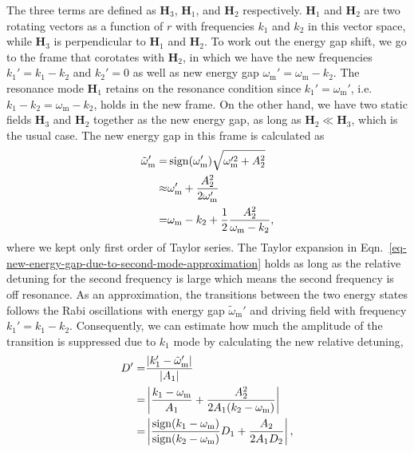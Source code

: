 The three terms are defined as $\mathbf  H_3$, $\mathbf H_1$, and $\mathbf H_2$ respectively. $\mathbf H_1$ and $\mathbf H_2$ are two rotating vectors as a function of $r$ with frequencies $k_1$ and $k_2$ in this vector space, while $\mathbf H_3$ is perpendicular to $\mathbf H_1$ and $\mathbf H_2$. To work out the energy gap shift, we go to the frame that corotates with $\mathbf H_2$, in which we have the new frequencies $k_1'=k_1-k_2$ and $k_2'=0$ as well as new energy gap $\omega_{\mathrm m}' = \omega_{\mathrm m}- k_2$. The resonance mode $\mathbf H_1$ retains on the resonance condition since $k_1'=\omega_{\mathrm m}'$, i.e. $k_1-k_2 = \omega_{\mathrm m}-k_2$, holds in the new frame. On the other hand, we have two static fields $\mathbf H_3$ and $\mathbf H_2$ together as the new energy gap, as long as $\mathbf H_2\ll \mathbf H_3$, which is the usual case. The new energy gap in this frame is calculated as
\begin{align}
    \tilde\omega_{\mathrm{m}}' =& \sign (\omega_{\mathrm m}') \sqrt{\omega_{\mathrm{m}}'^2 + A_2^2 } \nonumber\\
    \approx & \omega_{\mathrm{m}}' + \frac{A_2^2}{2\omega_{\mathrm m}'} \nonumber\\
    =& \omega_{\mathrm m} - k_2 + \frac{1}{2}\frac{A_2^2}{\omega_{\mathrm m} - k_2},
    \label{eq-new-energy-gap-due-to-second-mode-approximation}
\end{align}
where we kept only first order of Taylor series. The Taylor expansion in Eqn.~\ref{eq-new-energy-gap-due-to-second-mode-approximation} holds as long as the relative detuning for the second frequency is large which means the second frequency is off resonance. As an approximation, the transitions between the two energy states follows the Rabi oscillations with energy gap $\tilde \omega_{\mathrm m}'$ and driving field with frequency $k_1'=k_1-k_2$. Consequently, we can estimate how much the amplitude of the transition is suppressed due to $k_1$ mode by calculating the new relative detuning,
\begin{align}
    \RD' =& \frac{\lvert k_1' - \tilde \omega_{\mathrm m}' \rvert}{\lvert A_1 \rvert}\nonumber\\
    =& \left \lvert \frac{ k_1-\omega_{\mathrm m}}{ A_1} + \frac{ A_2^2 }{2  A_1 ( k_2 - \omega_{\mathrm m})} \right  \rvert\\
    =& \left \lvert  \frac{\sign({ k_1-\omega_{\mathrm m}})}{\sign (k_2 - \omega_{\mathrm m})} \RD_1 +  \frac{ A_2 }{2 A_1 \RD_2 }\right \rvert ,
    \label{eq-relative-detuning-changed}
\end{align}
